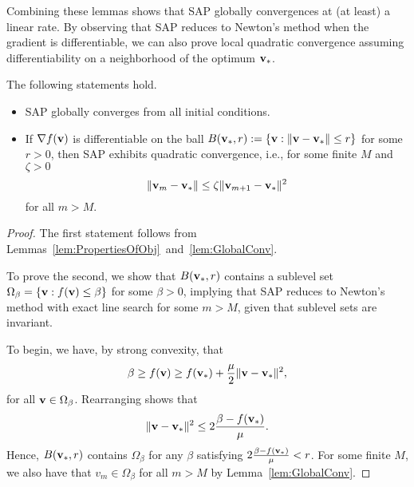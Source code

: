 Combining these lemmas shows that SAP globally convergences at (at least) a
linear rate.  By observing that SAP reduces to Newton's
method when the gradient is differentiable, we can also prove local quadratic
convergence assuming differentiability on a neighborhood of
the optimum ${\mathbf{v}}_*$. 
\begin{theorem}
  The following statements hold.
  \begin{itemize}
    \item SAP globally converges from all initial conditions.
    \item If $\nabla f({\mathbf{v}})$  is differentiable on the ball $B({\mathbf{v}}_*, r) := \{ {\mathbf{v}} :  \|{\mathbf{v}}-{\mathbf{v}}_*\| \le r\}$
  for some $r > 0$, then SAP exhibits quadratic convergence, i.e., for some finite
  $M$ and $\zeta > 0$
  \[
    \|{\mathbf{v}}_m - {\mathbf{v}}_*\| \le \zeta \|{\mathbf{v}}_{m+1} - {\mathbf{v}}_*\|^2
  \]
  for all $m > M$.
  \end{itemize}

  \begin{proof}

    The first statement follows from Lemmas~\ref{lem:PropertiesOfObj}~and~\ref{lem:GlobalConv}.

  To prove the second, we show that $B({\mathbf{v}}_*, r)$
    contains a sublevel set $\Omega_{\beta} = \{ {\mathbf{v}} : f({\mathbf{v}}) \le \beta\}$ for some
  $\beta > 0$,  implying that SAP 
  reduces to Newton's method with exact line search for some $m > M$,
 given that sublevel sets are invariant. 

  To begin, we have, by strong convexity, that
  \begin{equation}
    \beta \ge f(\vx) \ge f(\vx_*)  + \frac{\mu}{2} \|\vx-\vx_*\|^2,
    \label{eq:strong_convexity_at_differentiable_optimal}
  \end{equation}
    for all ${\mathbf{v}} \in \Omega_{\beta}$.
    Rearranging shows that
    \[
      \|{\mathbf{v}}-{\mathbf{v}}_*\|^2 \le 2\frac{\beta- f({\mathbf{v}}_*)}{\mu}.
    \]
    Hence, $B({\mathbf{v}}_*, r)$ contains
    $\Omega_{\beta}$ for any $\beta$ satisfying $2\frac{\beta- f({\mathbf{v}}_*)}{\mu} < r$.
    For some finite $M$, we also have that $v_m \in \Omega_{\beta}$ for all $m > M$ 
    by Lemma~\ref{lem:GlobalConv}.


\end{proof}
\end{theorem}
